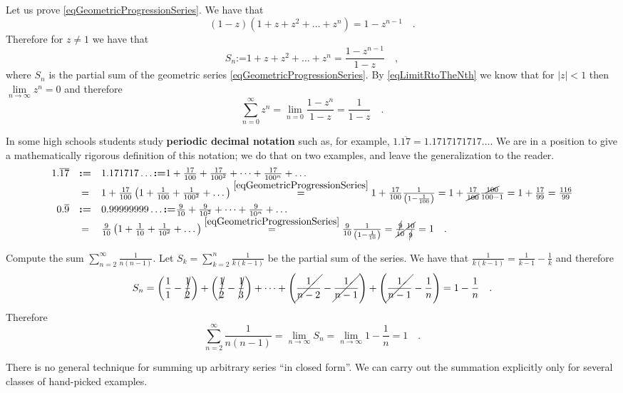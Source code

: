 \documentclass[12pt]{book}
\newcommand{\eqdef}{\textbf{:=}}
\renewcommand{\emph}{\textbf}
\begin{document}
Let us prove \eqref{eqGeometricProgressionSeries}. We have that 
\[(1-z)(1+z+z^2+\dots +z^{n})= 1- z^{n-1}\quad .
\]
Therefore for $z\neq 1$ we have that 
\[
S_n\eqdef 1+z+z^2+\dots +z^n=\frac{1-z^{n-1}}{1-z}\quad ,
\]
where $S_n$ is the partial sum of the geometric series \eqref{eqGeometricProgressionSeries}. By \eqref{eqLimitRtoTheNth} we know that for $|z|<1$ then $\lim\limits_{n\to \infty} z^n=0$ and therefore 
\[
\sum_{n=0}^{\infty}z^n=\lim\limits_{n=0} \frac{1-z^n}{1-z}= \frac{1}{1-z} \quad.
\]

In some high schools students study \emph{periodic decimal notation} such as, for example, $1.\overline{17}= 1.1717171717\dots$. We are in a position to give a mathematically rigorous definition of this notation; we do that on two examples, and leave the generalization to the reader.
\[
\begin{array}{rcl}
1.\overline{17}&\eqdef&  1.171717\dots\eqdef 1+ \frac{17}{100}+ \frac{17}{100^2}+\dots +\frac{17}{100^n}+\dots\\
&=&1+\frac{17}{100}\left(1+\frac{1}{100}+\frac{1}{100^2}+\dots \right)\stackrel{\eqref{eqGeometricProgressionSeries}}{=} 1+\frac{17}{100}\frac{1}{\left(1-\frac{1}{100}\right)}=1+\frac{17}{\cancel{100}}\frac{\cancel{100}}{100-1}= 1+\frac{17}{99}= \frac{116}{99}\\
0.\overline{9}&\eqdef&  0.99999999\dots \eqdef \frac{9}{10}+ \frac{9}{10^2}+\dots +\frac{9}{10^n}+\dots\\
&=&\frac{9}{10}\left(1+\frac{1}{10}+\frac{1}{10^2}+\dots \right)\stackrel{\eqref{eqGeometricProgressionSeries}}{=} \frac{9}{10}\frac{1}{\left(1-\frac{1}{10}\right)}=\frac{\cancel{9}}{\cancel{10}}\frac{\cancel{10}}{\cancel{9}}= 1\quad .
\end{array}
\]

Compute the sum $\sum\limits_{n=2}^{\infty}\frac{1}{n(n-1)}$. Let $S_k= \sum \limits_{k=2}^{n} \frac{1}{k(k-1)}$ be the partial sum of the series. We have that $\frac{1}{k(k-1)}= \frac{1}{k-1}-\frac{1}k$ and therefore 
\[
S_n= \left(\frac11-\cancel{ \frac12}\right)+ \left(\cancel{\frac12} -\cancel{ \frac13} \right) +\dots + \left(\cancel{\frac1{n-2}} -\cancel{\frac{1}{n-1}} \right)+ \left(\cancel{\frac1{n-1}}-\frac1n\right)
=1-\frac{1}n\quad .
\]
Therefore 
\[
\sum\limits_{n=2}^{\infty}\frac{1}{n(n-1)}= \lim\limits_{n\to \infty} S_n = \lim \limits_{n \to \infty} 1-\frac{1}n=1\quad .
\]

There is no general technique for summing up arbitrary series ``in closed form''. We can carry out the summation explicitly only for several classes of hand-picked examples. 
\end{document}
